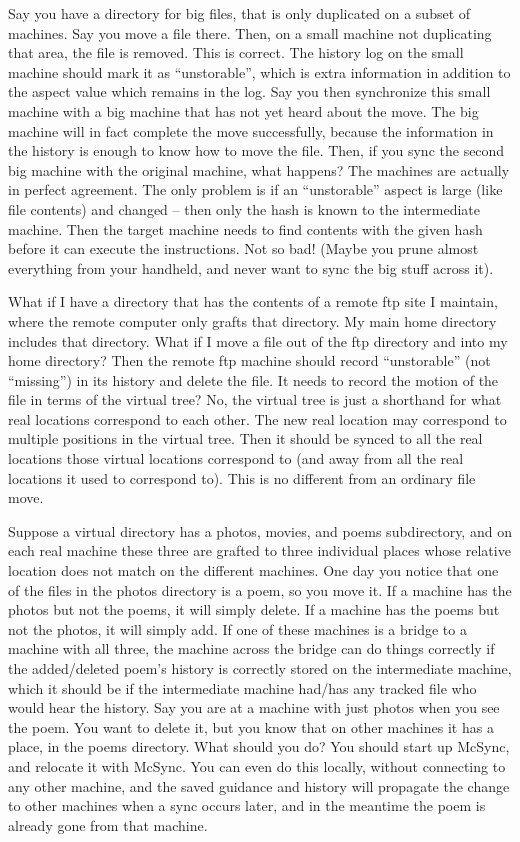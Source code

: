 \documentclass{book}
\begin{document}
Say you have a directory for big files, that is only duplicated on a subset of machines.  Say you move a file there.  Then, on a small machine not duplicating that area, the file is removed.  This is correct.  The history log on the small machine should mark it as ``unstorable'', which is extra information in addition to the aspect value which remains in the log.  Say you then synchronize this small machine with a big machine that has not yet heard about the move.  The big machine will in fact complete the move successfully, because the information in the history is enough to know how to move the file.  Then, if you sync the second big machine with the original machine, what happens?  The machines are actually in perfect agreement.  The only problem is if an ``unstorable'' aspect is large (like file contents) and changed -- then only the hash is known to the intermediate machine.  Then the target machine needs to find contents with the given hash before it can execute the instructions.  Not so bad!  (Maybe you prune almost everything from your handheld, and never want to sync the big stuff across it).

What if I have a directory that has the contents of a remote ftp site I maintain, where the remote computer only grafts that directory.  My main home directory includes that directory.  What if I move a file out of the ftp directory and into my home directory?  Then the remote ftp machine should record ``unstorable'' (not ``missing'') in its history and delete the file.  It needs to record the motion of the file in terms of the virtual tree?  No, the virtual tree is just a shorthand for what real locations correspond to each other.  The new real location may correspond to multiple positions in the virtual tree.  Then it should be synced to all the real locations those virtual locations correspond to (and away from all the real locations it used to correspond to).  This is no different from an ordinary file move.

Suppose a virtual directory has a photos, movies, and poems subdirectory, and on each real machine these three are grafted to three individual places whose relative location does not match on the different machines.  One day you notice that one of the files in the photos directory is a poem, so you move it.  If a machine has the photos but not the poems, it will simply delete.  If a machine has the poems but not the photos, it will simply add.  If one of these machines is a bridge to a machine with all three, the machine across the bridge can do things correctly if the added/deleted poem's history is correctly stored on the intermediate machine, which it should be if the intermediate machine had/has any tracked file who would hear the history.  Say you are at a machine with just photos when you see the poem.  You want to delete it, but you know that on other machines it has a place, in the poems directory.  What should you do?  You should start up McSync, and relocate it with McSync.  You can even do this locally, without connecting to any other machine, and the saved guidance and history will propagate the change to other machines when a sync occurs later, and in the meantime the poem is already gone from that machine.
\end{document}
